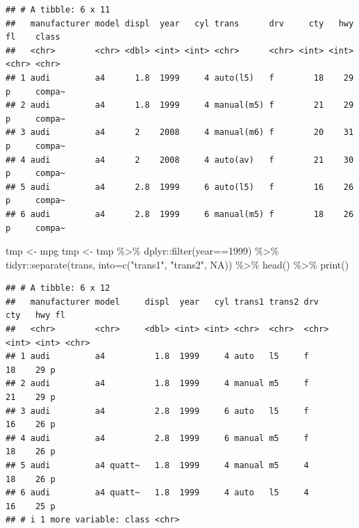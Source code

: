 \documentclass[
]{article}
\newenvironment{Shaded}{\begin{snugshade}}{\end{snugshade}}
\newcommand{\AttributeTok}[1]{\textcolor[rgb]{0.77,0.63,0.00}{#1}}
\newcommand{\ConstantTok}[1]{\textcolor[rgb]{0.00,0.00,0.00}{#1}}
\newcommand{\DecValTok}[1]{\textcolor[rgb]{0.00,0.00,0.81}{#1}}
\newcommand{\FunctionTok}[1]{\textcolor[rgb]{0.00,0.00,0.00}{#1}}
\newcommand{\NormalTok}[1]{#1}
\newcommand{\OtherTok}[1]{\textcolor[rgb]{0.56,0.35,0.01}{#1}}
\newcommand{\SpecialCharTok}[1]{\textcolor[rgb]{0.00,0.00,0.00}{#1}}
\newcommand{\StringTok}[1]{\textcolor[rgb]{0.31,0.60,0.02}{#1}}
\begin{document}
\begin{verbatim}
## # A tibble: 6 x 11
##   manufacturer model displ  year   cyl trans      drv     cty   hwy fl    class 
##   <chr>        <chr> <dbl> <int> <int> <chr>      <chr> <int> <int> <chr> <chr> 
## 1 audi         a4      1.8  1999     4 auto(l5)   f        18    29 p     compa~
## 2 audi         a4      1.8  1999     4 manual(m5) f        21    29 p     compa~
## 3 audi         a4      2    2008     4 manual(m6) f        20    31 p     compa~
## 4 audi         a4      2    2008     4 auto(av)   f        21    30 p     compa~
## 5 audi         a4      2.8  1999     6 auto(l5)   f        16    26 p     compa~
## 6 audi         a4      2.8  1999     6 manual(m5) f        18    26 p     compa~
\end{verbatim}

\begin{Shaded}
\begin{Highlighting}[]
\NormalTok{tmp }\OtherTok{\textless{}{-}}\NormalTok{ mpg}
\NormalTok{tmp }\OtherTok{\textless{}{-}}
\NormalTok{  tmp }\SpecialCharTok{\%\textgreater{}\%}
\NormalTok{  dplyr}\SpecialCharTok{::}\FunctionTok{filter}\NormalTok{(year}\SpecialCharTok{==}\DecValTok{1999}\NormalTok{) }\SpecialCharTok{\%\textgreater{}\%}
\NormalTok{  tidyr}\SpecialCharTok{::}\FunctionTok{separate}\NormalTok{(trans, }\AttributeTok{into=}\FunctionTok{c}\NormalTok{(}\StringTok{"trans1"}\NormalTok{, }\StringTok{"trans2"}\NormalTok{, }\ConstantTok{NA}\NormalTok{)) }\SpecialCharTok{\%\textgreater{}\%}
  \FunctionTok{head}\NormalTok{() }\SpecialCharTok{\%\textgreater{}\%}
  \FunctionTok{print}\NormalTok{()}
\end{Highlighting}
\end{Shaded}

\begin{verbatim}
## # A tibble: 6 x 12
##   manufacturer model     displ  year   cyl trans1 trans2 drv     cty   hwy fl   
##   <chr>        <chr>     <dbl> <int> <int> <chr>  <chr>  <chr> <int> <int> <chr>
## 1 audi         a4          1.8  1999     4 auto   l5     f        18    29 p    
## 2 audi         a4          1.8  1999     4 manual m5     f        21    29 p    
## 3 audi         a4          2.8  1999     6 auto   l5     f        16    26 p    
## 4 audi         a4          2.8  1999     6 manual m5     f        18    26 p    
## 5 audi         a4 quatt~   1.8  1999     4 manual m5     4        18    26 p    
## 6 audi         a4 quatt~   1.8  1999     4 auto   l5     4        16    25 p    
## # i 1 more variable: class <chr>
\end{verbatim}
\end{document}
